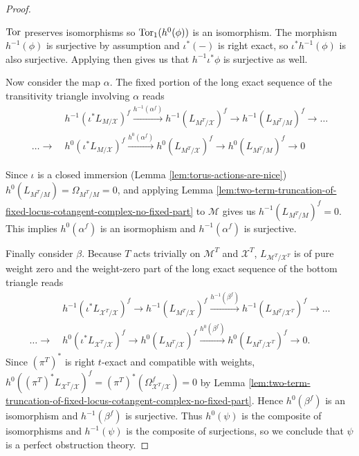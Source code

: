 \documentclass[12pt,dvipsnames]{amsart}
\begin{document}
\begin{proof}
\begin{center}
  \end{center}
  \(\operatorname{Tor}\) preserves isomorphisms so \(\operatorname{Tor}_1(h^0(\phi))\) is an isomorphism. The morphism \(h^{-1}(\phi)\) is surjective by assumption and \(\iota^*(-)\) is right exact, so \(\iota^*h^{-1}(\phi)\) is also surjective. Applying \cite[Lemma 05QA]{stacks-project} then gives us that \(h^{-1}\iota^*\phi\) is surjective as well.

  Now consider the map \(\alpha\). The fixed portion of the long exact sequence of the transitivity triangle involving \(\alpha\) reads
  \begin{align*}
    &h^{-1}(\iota^*L_{M/\mathcal X})^f \xrightarrow{h^{-1}(\alpha^f)}h^{-1}(L_{M^T/\mathcal X})^f \to h^{-1}(L_{M^T/M})^f \to \dots\\\dots \to ~& h^{0}(\iota^*L_{M/\mathcal X})^f \xrightarrow{h^{0}(\alpha^f)}h^{0}(L_{M^T/\mathcal X})^f \to h^{0}(L_{M^T/M})^f \to 0
  \end{align*}
  

  Since \(\iota\) is a closed immersion (Lemma \ref{lem:torus-actions-are-nice}) \(h^0(L_{M^T/M}) = \Omega_{M^T/M} = 0\), and applying Lemma \ref{lem:two-term-truncation-of-fixed-locus-cotangent-complex-no-fixed-part} to \(\mathcal M\) gives us \(h^{-1}(L_{M^T/M})^f = 0\). This implies \(h^0(\alpha^f)\) is an isormophism and \(h^{-1}(\alpha^f)\) is surjective.

  Finally consider \(\beta\). Because \(T\) acts trivially on \(\mathcal M^T\) and \(\mathcal X^T\), \(L_{\mathcal M^T/\mathcal X^T}\) is of pure weight zero and the weight-zero part of the long exact sequence of the bottom triangle reads
  \begin{align*}
    &h^{-1}(\iota^*L_{\mathcal X^T/\mathcal X})^f \to h^{-1}(L_{M^T/\mathcal X})^f \xrightarrow{h^{-1}(\beta^f)} h^{-1}(L_{M^T/\mathcal X^T})^f \to \dots\\\dots \to ~& h^{0}(\iota^*L_{\mathcal X^T/\mathcal X})^f \to h^{0}(L_{M^T/\mathcal X})^f \xrightarrow{h^{0}(\beta^f)} h^{0}(L_{M^T/\mathcal X^T})^f \to 0.
  \end{align*}
  Since \((\pi^T)^*\) is right \(t\)-exact and compatible with weights, \(h^0((\pi^T)^*L_{\mathcal X^T/\mathcal X})^f = (\pi^T)^*(\Omega^f_{\mathcal X^T/\mathcal X}) = 0\) by Lemma \ref{lem:two-term-truncation-of-fixed-locus-cotangent-complex-no-fixed-part}. Hence \(h^0(\beta^f)\) is an isomorphism and \(h^{-1}(\beta^f)\) is surjective. Thus \(h^0(\psi)\) is the composite of isomorphisms and \(h^{-1}(\psi)\) is the composite of surjections, so we conclude that \(\psi\) is a perfect obstruction theory.
\end{proof}
\end{document}
